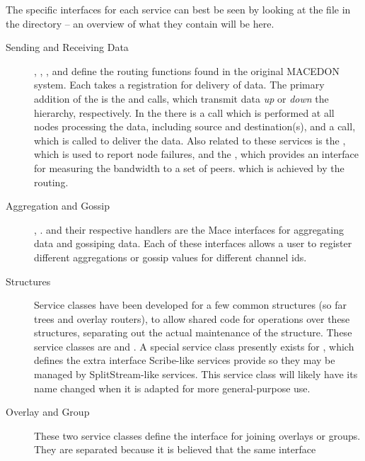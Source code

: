 The specific interfaces for each service can best be seen by looking at the 
 file in the  directory -- an 
overview of what they contain will be here.

\begin{description}
\item [Sending and Receiving Data] , , ,
  and  define the routing functions found
  in the original MACEDON system.  Each takes a  registration for 
  delivery of data.  The primary addition of the 
  is the  and  calls, which transmit data \emph{up} or 
  \emph{down} the hierarchy, respectively.  In the  there is a
   call which is performed at all nodes processing the data, including 
  source and destination(s), and a  call, which is called to deliver the data.
  Also related to these services is the , which is used to 
  report node failures, and the , which provides an 
  interface for measuring the bandwidth to a set of peers. which is achieved by the routing.
\item[Aggregation and Gossip] , .
  and their respective handlers are the Mace interfaces for aggregating data and gossiping data.
  Each of these interfaces allows a user to register different aggregations or gossip values for
  different channel ids.
\item[Structures] Service classes have been developed for a few common structures (so far trees
  and overlay routers), to allow shared code for operations over these structures,
  separating out the actual maintenance of the structure.  These service
  classes are  and
  .  A special service class presently exists for
  , which defines the extra interface
  Scribe-like services provide so they may be managed by SplitStream-like
  services.  This service class will likely have its name changed when it is
  adapted for more general-purpose use.
\item[Overlay and Group] These two service classes define the interface for joining overlays or 
  groups.  They are separated because it is believed that the same interface

\end{description}
